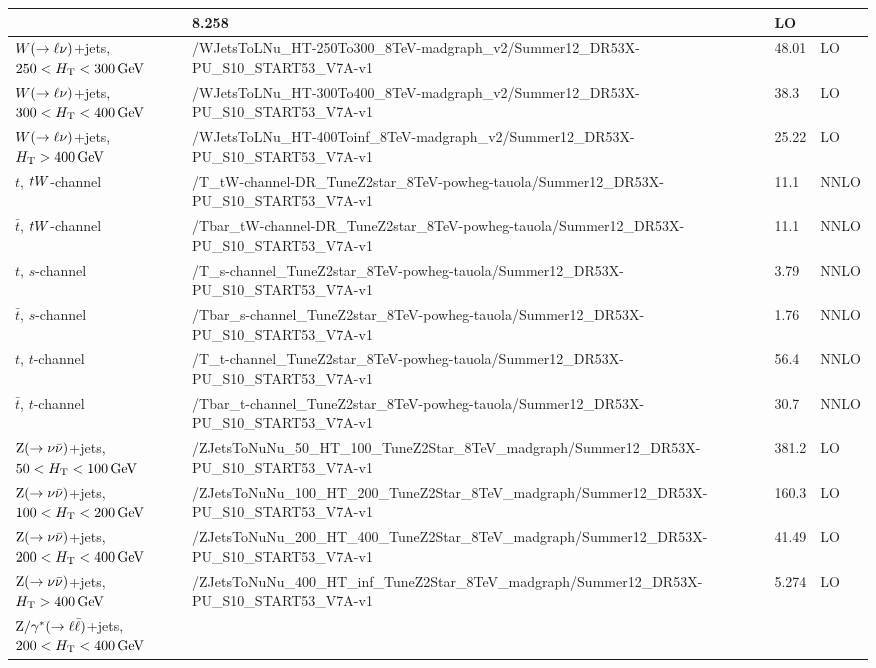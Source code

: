 \begin{table}
\begin{center}
\begin{tabular}{l l l l}
& 8.258 & LO \\
\midrule
$W(\rightarrow\ell\nu)$+jets, $250 < H_{\mathrm{T}} < 300\,\text{Ge\hspace{-.08em}V}$ & 
/WJetsToLNu\_HT-250To300\_8TeV-madgraph\_v2/Summer12\_DR53X-PU\_S10\_START53\_V7A-v1 & 48.01
& LO \\
$W(\rightarrow\ell\nu)$+jets, $300 < H_{\mathrm{T}} < 400\,\text{Ge\hspace{-.08em}V}$ &
/WJetsToLNu\_HT-300To400\_8TeV-madgraph\_v2/Summer12\_DR53X-PU\_S10\_START53\_V7A-v1 & 38.3 &
LO \\
$W(\rightarrow\ell\nu)$+jets, $H_{\mathrm{T}}  > 400\,\text{Ge\hspace{-.08em}V}$ &
/WJetsToLNu\_HT-400Toinf\_8TeV-madgraph\_v2/Summer12\_DR53X-PU\_S10\_START53\_V7A-v1 & 25.22
& LO \\
\midrule
$t$, $tW$-channel &
/T\_tW-channel-DR\_TuneZ2star\_8TeV-powheg-tauola/Summer12\_DR53X-PU\_S10\_START53\_V7A-v1 &
11.1 & NNLO \\
$\bar{t}$, $tW$-channel &
/Tbar\_tW-channel-DR\_TuneZ2star\_8TeV-powheg-tauola/Summer12\_DR53X-PU\_S10\_START53\_V7A-v1
& 11.1 & NNLO \\
$t$, $s$-channel &
/T\_s-channel\_TuneZ2star\_8TeV-powheg-tauola/Summer12\_DR53X-PU\_S10\_START53\_V7A-v1 & 3.79
& NNLO \\
$\bar{t}$, $s$-channel &
/Tbar\_s-channel\_TuneZ2star\_8TeV-powheg-tauola/Summer12\_DR53X-PU\_S10\_START53\_V7A-v1 &
1.76 & NNLO \\
$t$, $t$-channel &
/T\_t-channel\_TuneZ2star\_8TeV-powheg-tauola/Summer12\_DR53X-PU\_S10\_START53\_V7A-v1 & 56.4
& NNLO \\
$\bar{t}$, $t$-channel &
/Tbar\_t-channel\_TuneZ2star\_8TeV-powheg-tauola/Summer12\_DR53X-PU\_S10\_START53\_V7A-v1 &
30.7 & NNLO \\
\midrule
$\mathrm{Z} (\rightarrow \nu \bar{\nu})$+jets, $50 < H_{\mathrm{T}}  < 100\,\text{Ge\hspace{-.08em}V}$ & 
/ZJetsToNuNu\_50\_HT\_100\_TuneZ2Star\_8TeV\_madgraph/Summer12\_DR53X-PU\_S10\_START53\_V7A-v1 
& 381.2 & LO \\
$\mathrm{Z} (\rightarrow \nu \bar{\nu})$+jets, $100 < H_{\mathrm{T}}  < 200\,\text{Ge\hspace{-.08em}V}$ &
/ZJetsToNuNu\_100\_HT\_200\_TuneZ2Star\_8TeV\_madgraph/Summer12\_DR53X-PU\_S10\_START53\_V7A-v1 
& 160.3 & LO \\
$\mathrm{Z} (\rightarrow \nu \bar{\nu})$+jets, $200 < H_{\mathrm{T}}  < 400\,\text{Ge\hspace{-.08em}V}$ &
/ZJetsToNuNu\_200\_HT\_400\_TuneZ2Star\_8TeV\_madgraph/Summer12\_DR53X-PU\_S10\_START53\_V7A-v1 
& 41.49 & LO \\
$\mathrm{Z} (\rightarrow \nu \bar{\nu})$+jets, $H_{\mathrm{T}}  > 400\,\text{Ge\hspace{-.08em}V}$ &
/ZJetsToNuNu\_400\_HT\_inf\_TuneZ2Star\_8TeV\_madgraph/Summer12\_DR53X-PU\_S10\_START53\_V7A-v1 
& 5.274 & LO \\
\midrule
$\mathrm{Z}/\gamma^* (\rightarrow \ell \bar{\ell})$+jets, $200 < H_{\mathrm{T}}  < 400\,\text{Ge\hspace{-.08em}V}$ &

\end{tabular}
\end{center}
\end{table}
